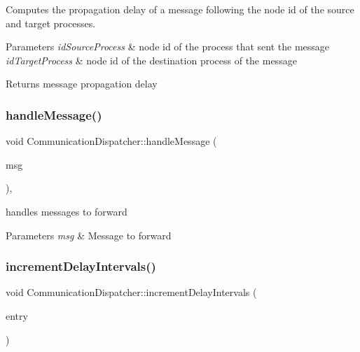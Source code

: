 Computes the propagation delay of a message following the node id of the source and target processes. 


\begin{DoxyParams}{Parameters}
{\em id\+Source\+Process} & node id of the process that sent the message \\
\hline
{\em id\+Target\+Process} & node id of the destination process of the message \\
\hline
\end{DoxyParams}
\begin{DoxyReturn}{Returns}
message propagation delay 
\end{DoxyReturn}
\mbox{\label{class_communication_dispatcher_af7be3dbf46282e78d41d3d194f5ff246}} 
\subsubsection{\texorpdfstring{handle\+Message()}{handleMessage()}}
{\footnotesize\ttfamily void Communication\+Dispatcher\+::handle\+Message (\begin{DoxyParamCaption}\item[{c\+Message $\ast$}]{msg }\end{DoxyParamCaption})\hspace{0.3cm}{\ttfamily [private]}, {\ttfamily [virtual]}}



handles messages to forward 


\begin{DoxyParams}{Parameters}
{\em msg} & Message to forward \\
\hline
\end{DoxyParams}
\mbox{\label{class_communication_dispatcher_ab87c3d69a5953f9bda369d53c2de90d7}} 
\subsubsection{\texorpdfstring{increment\+Delay\+Intervals()}{incrementDelayIntervals()}}
{\footnotesize\ttfamily void Communication\+Dispatcher\+::increment\+Delay\+Intervals (\begin{DoxyParamCaption}\item[{unsigned int}]{entry }\end{DoxyParamCaption})\hspace{0.3cm}{\ttfamily [private]}}



